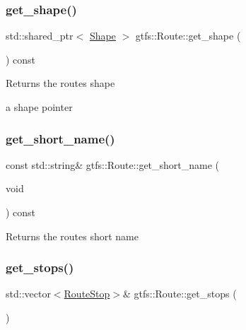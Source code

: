 \subsubsection{\texorpdfstring{get\+\_\+shape()}{get\_shape()}}
{\footnotesize\ttfamily std\+::shared\+\_\+ptr$<$ \hyperlink{classgtfs_1_1Shape}{Shape} $>$ gtfs\+::\+Route\+::get\+\_\+shape (\begin{DoxyParamCaption}{ }\end{DoxyParamCaption}) const}

\begin{DoxyReturn}{Returns}
the route\textquotesingle{}s shape

a shape pointer 
\end{DoxyReturn}
\mbox{\label{classgtfs_1_1Route_a2a0fcdf687d5e326b20c5043c9db874f}} 
\subsubsection{\texorpdfstring{get\+\_\+short\+\_\+name()}{get\_short\_name()}}
{\footnotesize\ttfamily const std\+::string\& gtfs\+::\+Route\+::get\+\_\+short\+\_\+name (\begin{DoxyParamCaption}\item[{void}]{ }\end{DoxyParamCaption}) const\hspace{0.3cm}{\ttfamily [inline]}}

\begin{DoxyReturn}{Returns}
the route\textquotesingle{}s short name 
\end{DoxyReturn}
\mbox{\label{classgtfs_1_1Route_aa34e7c477efcde44cc03138cb9a0b8c8}} 
\subsubsection{\texorpdfstring{get\+\_\+stops()}{get\_stops()}}
{\footnotesize\ttfamily std\+::vector$<$\hyperlink{structgtfs_1_1RouteStop}{Route\+Stop}$>$\& gtfs\+::\+Route\+::get\+\_\+stops (\begin{DoxyParamCaption}{ }\end{DoxyParamCaption})\hspace{0.3cm}{\ttfamily [inline]}}


